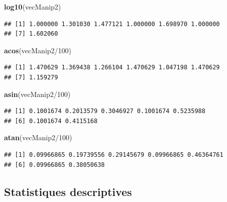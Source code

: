 \documentclass[twoside,symmetric]{book}
\newenvironment{Shaded}{}{}
\newcommand{\DecValTok}[1]{#1}
\newcommand{\KeywordTok}[1]{\textbf{#1}}
\newcommand{\NormalTok}[1]{#1}
\newcommand{\OperatorTok}[1]{#1}
\begin{document}
\begin{Shaded}
\begin{Highlighting}[]
\KeywordTok{log10}\NormalTok{(vecManip2)}
\end{Highlighting}
\end{Shaded}

\begin{verbatim}
## [1] 1.000000 1.301030 1.477121 1.000000 1.698970 1.000000
## [7] 1.602060
\end{verbatim}

\begin{Shaded}
\begin{Highlighting}[]
\KeywordTok{acos}\NormalTok{(vecManip2}\OperatorTok{/}\DecValTok{100}\NormalTok{)}
\end{Highlighting}
\end{Shaded}

\begin{verbatim}
## [1] 1.470629 1.369438 1.266104 1.470629 1.047198 1.470629
## [7] 1.159279
\end{verbatim}

\begin{Shaded}
\begin{Highlighting}[]
\KeywordTok{asin}\NormalTok{(vecManip2}\OperatorTok{/}\DecValTok{100}\NormalTok{)}
\end{Highlighting}
\end{Shaded}

\begin{verbatim}
## [1] 0.1001674 0.2013579 0.3046927 0.1001674 0.5235988
## [6] 0.1001674 0.4115168
\end{verbatim}

\begin{Shaded}
\begin{Highlighting}[]
\KeywordTok{atan}\NormalTok{(vecManip2}\OperatorTok{/}\DecValTok{100}\NormalTok{)}
\end{Highlighting}
\end{Shaded}

\begin{verbatim}
## [1] 0.09966865 0.19739556 0.29145679 0.09966865 0.46364761
## [6] 0.09966865 0.38050638
\end{verbatim}

\hypertarget{statistiques-descriptives}{%
\subsection{Statistiques descriptives}\label{statistiques-descriptives}}
\end{document}
